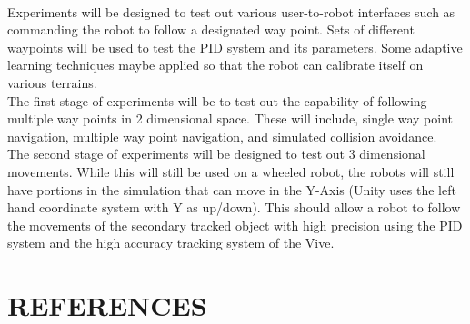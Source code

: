 \documentclass[10pt,a4paper]{article}
\begin{document}
	\\
	Experiments will be designed to test out various user-to-robot interfaces such as commanding the robot to follow a designated way point. Sets of different waypoints will be used to test the PID system and its parameters. Some adaptive learning techniques maybe applied so that the robot can calibrate itself on various terrains.
	\\
	The first stage of experiments will be to test out the capability of following multiple way points in 2 dimensional space. These will include, single way point navigation, multiple way point navigation, and simulated collision avoidance.
	\\
	The second stage of experiments will be designed to test out 3 dimensional movements. While this will still be used on a wheeled robot, the robots will still have portions in the simulation that can move in the Y-Axis (Unity uses the left hand coordinate system with Y as up/down). This should allow a robot to follow the movements of the secondary tracked object with high precision using the PID system and the high accuracy tracking system of the Vive.
	
	\section*{REFERENCES}
	\begin{thebibliography}{99}
		
		
	\end{thebibliography}
\end{document}
